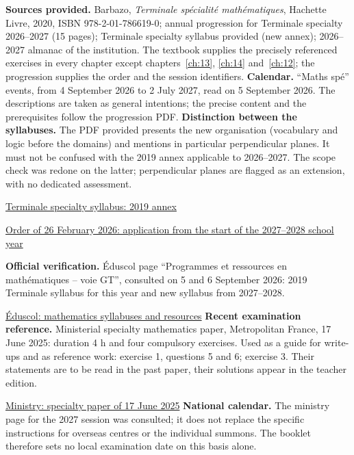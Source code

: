 \textbf{Sources provided.} Barbazo, \emph{Terminale spécialité mathématiques}, Hachette Livre, 2020, ISBN 978-2-01-786619-0; annual progression for Terminale specialty 2026--2027 (15 pages); Terminale specialty syllabus provided (new annex); 2026--2027 almanac of the institution. The textbook supplies the precisely referenced exercises in every chapter except chapters~\ref{ch:13}, \ref{ch:14} and~\ref{ch:12}; the progression supplies the order and the session identifiers.
\textbf{Calendar.} ``Maths spé'' events, from 4 September 2026 to 2 July 2027, read on 5 September 2026. The descriptions are taken as general intentions; the precise content and the prerequisites follow the progression PDF.
\textbf{Distinction between the syllabuses.} The PDF provided presents the new organisation (vocabulary and logic before the domains) and mentions in particular perpendicular planes. It must not be confused with the 2019 annex applicable to 2026--2027. The scope check was redone on the latter; perpendicular planes are flagged as an extension, with no dedicated assessment.\par
\href{https://eduscol.education.gouv.fr/sites/default/files/document/spe246annexe1158907pdf-84159.pdf}{Terminale specialty syllabus: 2019 annex}\par
\href{https://www.education.gouv.fr/bo/2026/Hebdo14/MENE2602919A}{Order of 26 February 2026: application from the start of the 2027--2028 school year}\par
\textbf{Official verification.} Éduscol page ``Programmes et ressources en mathématiques -- voie GT'', consulted on 5 and 6 September 2026: 2019 Terminale syllabus for this year and new syllabus from 2027--2028.\par
\href{https://eduscol.education.gouv.fr/5817/programmes-et-ressources-en-mathematiques-voie-gt}{Éduscol: mathematics syllabuses and resources}
\textbf{Recent examination reference.} Ministerial specialty mathematics paper, Metropolitan France, 17 June 2025: duration 4 h and four compulsory exercises. Used as a guide for write-ups and as reference work: exercise 1, questions 5 and 6; exercise 3. Their statements are to be read in the past paper, their solutions appear in the teacher edition.\par
\href{https://www.education.gouv.fr/sites/default/files/2025-06/baccalaur-at-g-n-ral-2025-math-matiques-440856.pdf}{Ministry: specialty paper of 17 June 2025}
\textbf{National calendar.} The ministry page for the 2027 session was consulted; it does not replace the specific instructions for overseas centres or the individual summons. The booklet therefore sets no local examination date on this basis alone.\par
